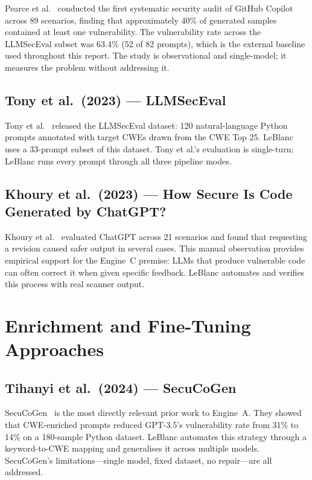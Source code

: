 \documentclass[12pt,a4paper]{report}
\begin{document}
Pearce et al.~\cite{pearce2022asleep} conducted the first systematic security
audit of GitHub Copilot across 89 scenarios, finding that approximately 40\% of
generated samples contained at least one vulnerability. The vulnerability rate
across the LLMSecEval subset was 63.4\% (52 of 82 prompts), which is the external
baseline used throughout this report. The study is observational and single-model;
it measures the problem without addressing it.

\subsection{Tony et al.\ (2023) --- LLMSecEval}

Tony et al.~\cite{tony2023llmseceval} released the LLMSecEval dataset: 120
natural-language Python prompts annotated with target CWEs drawn from the CWE
Top 25. LeBlanc uses a 33-prompt subset of this dataset. Tony et al.'s evaluation
is single-turn; LeBlanc runs every prompt through all three pipeline modes.

\subsection{Khoury et al.\ (2023) --- How Secure Is Code Generated by ChatGPT?}

Khoury et al.~\cite{khoury2023secure} evaluated ChatGPT across 21 scenarios and
found that requesting a revision caused safer output in several cases. This manual
observation provides empirical support for the Engine~C premise: LLMs that produce
vulnerable code can often correct it when given specific feedback. LeBlanc
automates and verifies this process with real scanner output.

\section{Enrichment and Fine-Tuning Approaches}
\label{sec:litenrich}

\subsection{Tihanyi et al.\ (2024) --- SecuCoGen}

SecuCoGen~\cite{tihanyi2023secucogenicse} is the most directly relevant prior
work to Engine~A. They showed that CWE-enriched prompts reduced GPT-3.5's
vulnerability rate from 31\% to 14\% on a 180-sample Python dataset. LeBlanc
automates this strategy through a keyword-to-CWE mapping and generalises it
across multiple models. SecuCoGen's limitations---single model, fixed dataset,
no repair---are all addressed.
\end{document}
